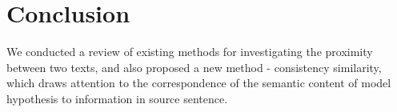 \documentclass[11pt]{article}
\begin{document}

\section{Conclusion}
We conducted a review of existing methods for investigating the proximity between two texts, and also proposed a new method - consistency similarity, which draws attention to the correspondence of the semantic content of model hypothesis to information in source sentence. 




\appendix

\end{document}
